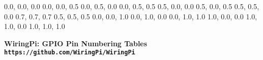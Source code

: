 \documentclass[12pt,a4paper]{article}
\begin{document}
\begin{sffamily}
\definecolor{rtb-black}{rgb}  {0.0, 0.0, 0.0}
\definecolor{rtb-navy}{rgb}   {0.0, 0.0, 0.5}
\definecolor{rtb-green}{rgb}  {0.0, 0.5, 0.0}
\definecolor{rtb-teal}{rgb}   {0.0, 0.5, 0.5}
\definecolor{rtb-maroon}{rgb} {0.5, 0.0, 0.0}
\definecolor{rtb-purple}{rgb} {0.5, 0.0, 0.5}
\definecolor{rtb-olive}{rgb}  {0.5, 0.5, 0.0}
\definecolor{rtb-silver}{rgb} {0.7, 0.7, 0.7}
\definecolor{rtb-grey}{rgb}   {0.5, 0.5, 0.5}
\definecolor{rtb-blue}{rgb}   {0.0, 0.0, 1.0}
\definecolor{rtb-lime}{rgb}   {0.0, 1.0, 0.0}
\definecolor{rtb-aqua}{rgb}   {0.0, 1.0, 1.0}
\definecolor{rtb-red}{rgb}    {1.0, 0.0, 0.0}
\definecolor{rtb-yellow}{rgb} {1.0, 1.0, 0.0}
\definecolor{rtb-white}{rgb}  {1.0, 1.0, 1.0}

\begin{center}
\bfseries{WiringPi: GPIO Pin Numbering Tables}\\
\tt{https://github.com/WiringPi/WiringPi}
\end{center}


\end{sffamily}
\end{document}

